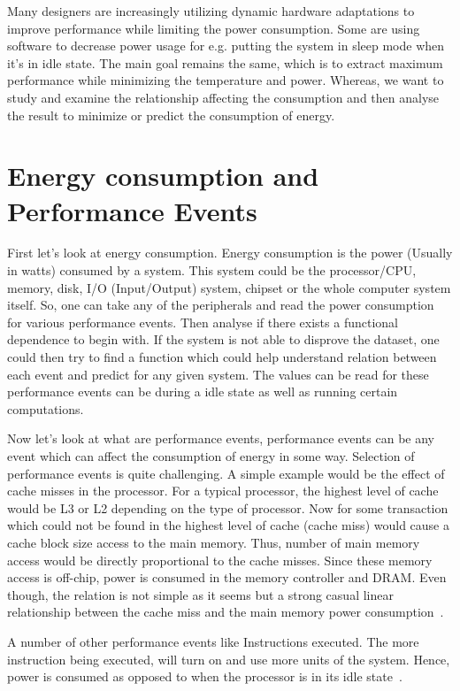 Many designers are increasingly utilizing dynamic hardware adaptations to improve performance while limiting the power consumption. Some are using software to decrease power usage for e.g. putting the system in sleep mode when it's in idle state. The main goal remains the same, which is to extract maximum performance while minimizing the temperature and power. Whereas, we want to study and examine the relationship affecting the consumption and then analyse the result to minimize or predict the consumption of energy.

\section{Energy consumption and Performance Events}

First let's look at energy consumption. Energy consumption is the power (Usually in watts) consumed by a system. This system could be the processor/CPU, memory, disk, I/O (Input/Output) system, chipset or the whole computer system itself. So, one can take any of the peripherals and read the power consumption for various performance events. Then analyse if there exists a functional dependence to begin with. If the system is not able to disprove the dataset, one could then try to find a function which could help understand relation between each event and predict for any given system. The values can be read for these performance events can be during a idle state as well as running certain computations.

Now let's look at what are performance events, performance events can be any event which can affect the consumption of energy in some way. Selection of performance events is quite challenging. A simple example would be the effect of cache misses in the processor. For a typical processor, the highest level of cache would be L3 or L2 depending on the type of processor. Now for some transaction which could not be found in the highest level of cache (cache miss) would cause a cache block size access to the main memory. Thus, number of main memory access would be directly proportional to the cache misses. Since these memory access is off-chip, power is consumed in the memory controller and DRAM. Even though, the relation is not simple as it seems but a strong casual linear relationship between the cache miss and the main memory power consumption~\cite{bircher2007complete}.

A number of other performance events like Instructions executed. The more instruction being executed, will turn on and use  more units of the system. Hence, power is consumed as opposed to when the processor is in its idle state~\cite{gilberto2005power}.

